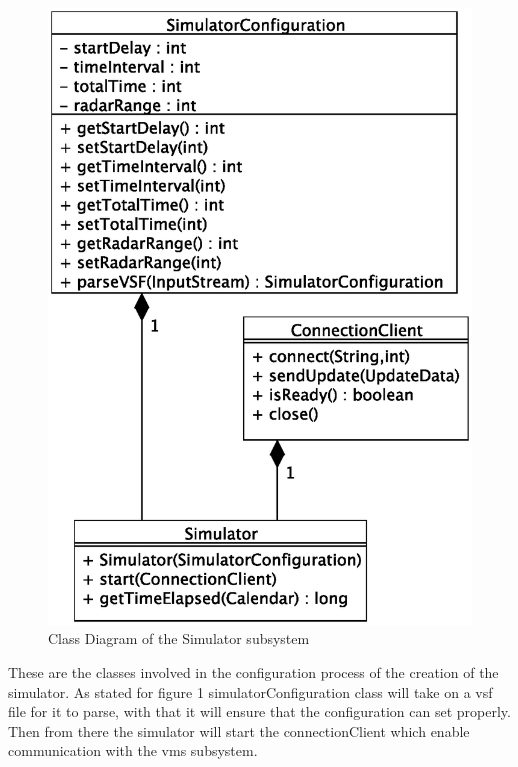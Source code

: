 \documentclass{article}
\begin{document}
\break

\begin{figure}[!htb]
\caption{Class Diagram of the Simulator subsystem}
\centering
\includegraphics[scale=0.3]{diagrams/simulator-class-diagram.eps}
\end{figure}

These are the classes involved in the configuration process of the creation of the simulator. As stated for figure 1 simulatorConfiguration class will take on a vsf file for it to parse, with that it will ensure that the configuration can set properly. Then from there the simulator will start the connectionClient which enable communication with the vms subsystem.
\end{document}

